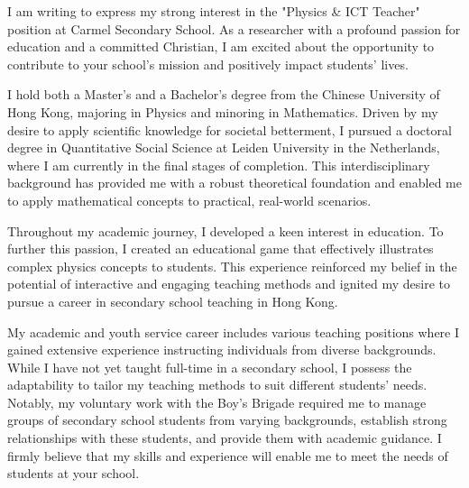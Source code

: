 \documentclass[11pt, a4paper]{awesome-cv}
\begin{document}
\makecvheader[R]

\makecvfooter
  {}%
  {}%
  {}

\makelettertitle

\begin{cvletter}

I am writing to express my strong interest in the "Physics \& ICT Teacher" position at Carmel Secondary School. As a researcher with a profound passion for education and a committed Christian, I am excited about the opportunity to contribute to your school's mission and positively impact students' lives.

I hold both a Master's and a Bachelor's degree from the Chinese University of Hong Kong, majoring in Physics and minoring in Mathematics. Driven by my desire to apply scientific knowledge for societal betterment, I pursued a doctoral degree in Quantitative Social Science at Leiden University in the Netherlands, where I am currently in the final stages of completion. This interdisciplinary background has provided me with a robust theoretical foundation and enabled me to apply mathematical concepts to practical, real-world scenarios.

Throughout my academic journey, I developed a keen interest in education. To further this passion, I created an educational game that effectively illustrates complex physics concepts to students. This experience reinforced my belief in the potential of interactive and engaging teaching methods and ignited my desire to pursue a career in secondary school teaching in Hong Kong.

My academic and youth service career includes various teaching positions where I gained extensive experience instructing individuals from diverse backgrounds. While I have not yet taught full-time in a secondary school, I possess the adaptability to tailor my teaching methods to suit different students' needs. Notably, my voluntary work with the Boy's Brigade required me to manage groups of secondary school students from varying backgrounds, establish strong relationships with these students, and provide them with academic guidance. I firmly believe that my skills and experience will enable me to meet the needs of students at your school.


\end{cvletter}
\end{document}

